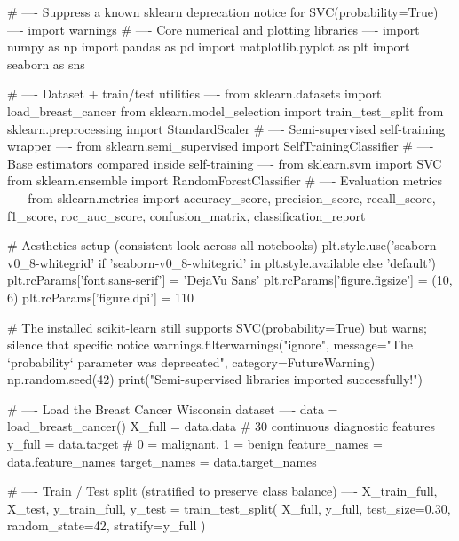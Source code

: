 
\begin{codebox}[title={Suppress a known sklearn deprecation notice for SVC(probability=True)}]
# ---- Suppress a known sklearn deprecation notice for SVC(probability=True) ----
import warnings
# ---- Core numerical and plotting libraries ----
import numpy as np
import pandas as pd
import matplotlib.pyplot as plt
import seaborn as sns

# ---- Dataset + train/test utilities ----
from sklearn.datasets import load_breast_cancer
from sklearn.model_selection import train_test_split
from sklearn.preprocessing import StandardScaler
# ---- Semi-supervised self-training wrapper ----
from sklearn.semi_supervised import SelfTrainingClassifier
# ---- Base estimators compared inside self-training ----
from sklearn.svm import SVC
from sklearn.ensemble import RandomForestClassifier
# ---- Evaluation metrics ----
from sklearn.metrics import accuracy_score, precision_score, recall_score, f1_score, roc_auc_score, confusion_matrix, classification_report

# Aesthetics setup (consistent look across all notebooks)
plt.style.use('seaborn-v0_8-whitegrid' if 'seaborn-v0_8-whitegrid' in plt.style.available else 'default')
plt.rcParams['font.sans-serif'] = 'DejaVu Sans'
plt.rcParams['figure.figsize'] = (10, 6)
plt.rcParams['figure.dpi'] = 110

# The installed scikit-learn still supports SVC(probability=True) but warns; silence that specific notice
warnings.filterwarnings("ignore", message="The `probability` parameter was deprecated", category=FutureWarning)
np.random.seed(42)
print("Semi-supervised libraries imported successfully!")

# ---- Load the Breast Cancer Wisconsin dataset ----
data = load_breast_cancer()
X_full = data.data            # 30 continuous diagnostic features
y_full = data.target          # 0 = malignant, 1 = benign
feature_names = data.feature_names
target_names = data.target_names

# ---- Train / Test split (stratified to preserve class balance) ----
X_train_full, X_test, y_train_full, y_test = train_test_split(
    X_full, y_full, test_size=0.30, random_state=42, stratify=y_full
)


\end{codebox}
